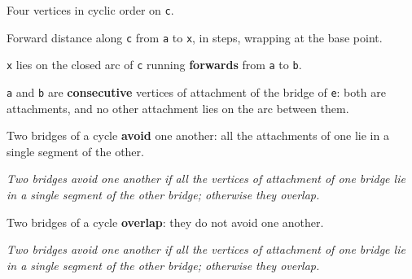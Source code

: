 \begin{definition}
\label{SimpleGraph.Walk.InCyclicOrder}
\leanok
{}
Four vertices in cyclic order on \texttt{c}.
\end{definition}

\begin{definition}
\label{SimpleGraph.Walk.cycleDist}
\leanok
{}
Forward distance along \texttt{c} from \texttt{a} to \texttt{x}, in steps, wrapping at
the base point.
\end{definition}

\begin{definition}
\label{SimpleGraph.Walk.OnArc}
\leanok
{}
\texttt{x} lies on the closed arc of \texttt{c} running \textbf{forwards} from \texttt{a} to \texttt{b}.
\end{definition}

\begin{definition}
\label{SimpleGraph.ConsecutiveAttach}
\leanok
{}
\texttt{a} and \texttt{b} are \textbf{consecutive} vertices of attachment of the bridge of \texttt{e}: both
are attachments, and no other attachment lies on the arc between them.
\end{definition}

\begin{definition}
\label{SimpleGraph.Avoids}
\leanok
{}
Two bridges of a cycle \textbf{avoid} one another: all the attachments of one lie in a
single segment of the other.

\emph{Two bridges avoid one another if all the
vertices of attachment of one bridge lie in a single segment of the other bridge;
otherwise they overlap.}
\end{definition}

\begin{definition}
\label{SimpleGraph.Overlaps}
Two bridges of a cycle \textbf{overlap}: they do not avoid one another.

\emph{Two bridges avoid one another if all the
vertices of attachment of one bridge lie in a single segment of the other bridge;
otherwise they overlap.}
\end{definition}

